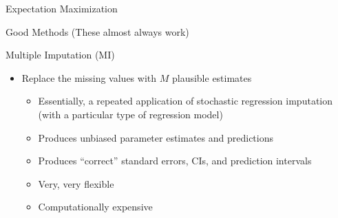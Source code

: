 \documentclass{beamer}\usepackage[]{graphicx}\usepackage[]{color}
\begin{document}

\begin{frame}{Expectation Maximization}
  
\end{frame}


\begin{frame}{Good Methods (These almost always work)}
  
  Multiple Imputation (MI)
  \vc
  \begin{itemize}
  \item Replace the missing values with $M$ plausible estimates
    \vc
    \begin{itemize}
    \item Essentially, a repeated application of stochastic regression 
      imputation (with a particular type of regression model)
      \vc
    \item Produces unbiased parameter estimates and predictions
      \vc
    \item Produces ``correct'' standard errors, CIs, and prediction intervals
      \vc
    \item Very, very flexible
      \vc
    \item Computationally expensive
    \end{itemize}
  \end{itemize}
  
\end{frame}

\watermarkoff %
\end{document}
